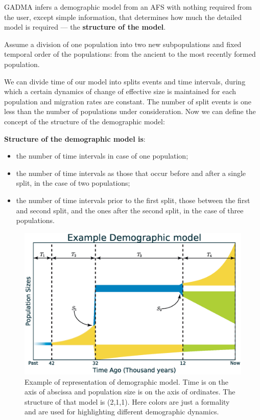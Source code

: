 \documentclass[12pt]{article}
\begin{document}
GADMA infers a demographic model from an AFS with nothing required from the user, except simple information, that determines how much the detailed model is required --- the \textbf{structure of the model}.

Assume a division of one population into two new subpopulations and fixed temporal order of the populations: from the ancient to the most recently formed population. 

We can divide time of our model into splits events and time intervals, during which a certain dynamics of change of effective size is maintained for each population and migration rates are constant. The number of split events is one less than the number of populations under consideration. Now we can define the concept of the structure of the demographic model:

\textbf{Structure of the demographic model is}:
\begin{itemize}
    \item the number of time intervals in case of one population;
    \item the number of time intervals as those that occur before and after a single split, in the case of  two populations;
    \item the number of time intervals prior to the first split, those between the first and second split, and the ones after the second split, in the case of three populations.
\end{itemize} 

\begin{figure}[b!]
  \centering
  \includegraphics[width=0.7\linewidth]{dem_model_col.eps}
  \caption{Example of representation of demographic model. Time is on the axis of abscissa and population size is on the axis of ordinates. The structure of that model is (2,1,1). Here colors are just a formality and are used for highlighting different demographic dynamics.}
  \label{fig:exaple_of_model_plot}
\end{figure}
\end{document}
